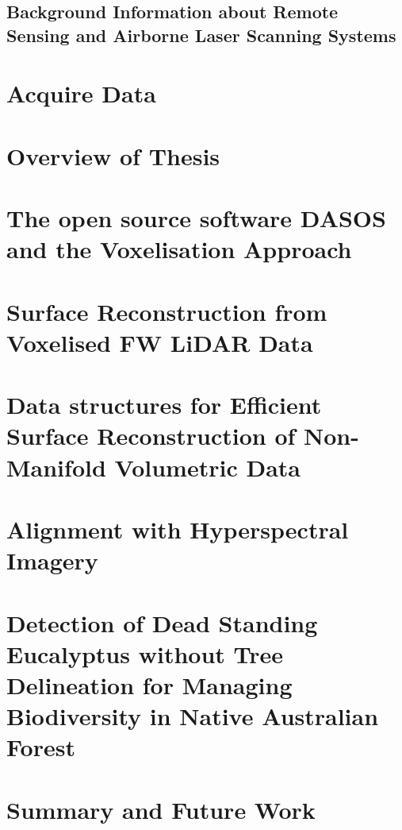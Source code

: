 \documentclass[11pt,nofootinbib]{report}
\begin{document}
		\section{Background Information about Remote Sensing and Airborne Laser Scanning Systems}\label{Background}
			
			\newpage
		
    \chapter{Acquire Data}\label{AcquireData}
		 
	    \newpage
	\chapter{Overview of Thesis}\label{PipeLine}
		

	\chapter{The open source software DASOS and the Voxelisation Approach}\label{DASOS_Voxelisation}
			
	\newpage


		 		
	\chapter{Surface Reconstruction from Voxelised FW LiDAR Data}\label{Visualisations}
		

		\newpage
    \chapter{Data structures for Efficient Surface Reconstruction of Non-Manifold Volumetric Data}\label{Optimisations}
      
			 \newpage
	\chapter{Alignment with Hyperspectral Imagery}\label{Alignment}
		
		\newpage		
	\chapter{Detection of Dead Standing Eucalyptus without Tree Delineation for Managing Biodiversity in Native Australian Forest}\label{Classifications}
		
		\newpage
	\chapter{Summary and Future Work}\label{Conclusions}
		
		\newpage
		
\end{document}
